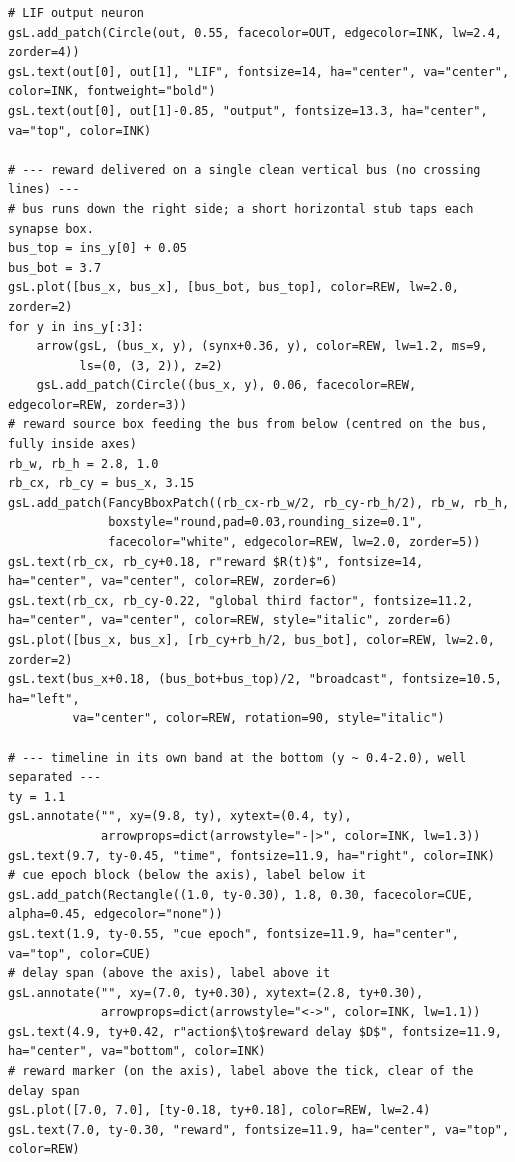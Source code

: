\begin{lstlisting}[caption={schematics.ipynb code cell 6},label={lst:mrl-nb-schematics-6}]
# LIF output neuron
gsL.add_patch(Circle(out, 0.55, facecolor=OUT, edgecolor=INK, lw=2.4, zorder=4))
gsL.text(out[0], out[1], "LIF", fontsize=14, ha="center", va="center", color=INK, fontweight="bold")
gsL.text(out[0], out[1]-0.85, "output", fontsize=13.3, ha="center", va="top", color=INK)

# --- reward delivered on a single clean vertical bus (no crossing lines) ---
# bus runs down the right side; a short horizontal stub taps each synapse box.
bus_top = ins_y[0] + 0.05
bus_bot = 3.7
gsL.plot([bus_x, bus_x], [bus_bot, bus_top], color=REW, lw=2.0, zorder=2)
for y in ins_y[:3]:
    arrow(gsL, (bus_x, y), (synx+0.36, y), color=REW, lw=1.2, ms=9,
          ls=(0, (3, 2)), z=2)
    gsL.add_patch(Circle((bus_x, y), 0.06, facecolor=REW, edgecolor=REW, zorder=3))
# reward source box feeding the bus from below (centred on the bus, fully inside axes)
rb_w, rb_h = 2.8, 1.0
rb_cx, rb_cy = bus_x, 3.15
gsL.add_patch(FancyBboxPatch((rb_cx-rb_w/2, rb_cy-rb_h/2), rb_w, rb_h,
              boxstyle="round,pad=0.03,rounding_size=0.1",
              facecolor="white", edgecolor=REW, lw=2.0, zorder=5))
gsL.text(rb_cx, rb_cy+0.18, r"reward $R(t)$", fontsize=14, ha="center", va="center", color=REW, zorder=6)
gsL.text(rb_cx, rb_cy-0.22, "global third factor", fontsize=11.2, ha="center", va="center", color=REW, style="italic", zorder=6)
gsL.plot([bus_x, bus_x], [rb_cy+rb_h/2, bus_bot], color=REW, lw=2.0, zorder=2)
gsL.text(bus_x+0.18, (bus_bot+bus_top)/2, "broadcast", fontsize=10.5, ha="left",
         va="center", color=REW, rotation=90, style="italic")

# --- timeline in its own band at the bottom (y ~ 0.4-2.0), well separated ---
ty = 1.1
gsL.annotate("", xy=(9.8, ty), xytext=(0.4, ty),
             arrowprops=dict(arrowstyle="-|>", color=INK, lw=1.3))
gsL.text(9.7, ty-0.45, "time", fontsize=11.9, ha="right", color=INK)
# cue epoch block (below the axis), label below it
gsL.add_patch(Rectangle((1.0, ty-0.30), 1.8, 0.30, facecolor=CUE, alpha=0.45, edgecolor="none"))
gsL.text(1.9, ty-0.55, "cue epoch", fontsize=11.9, ha="center", va="top", color=CUE)
# delay span (above the axis), label above it
gsL.annotate("", xy=(7.0, ty+0.30), xytext=(2.8, ty+0.30),
             arrowprops=dict(arrowstyle="<->", color=INK, lw=1.1))
gsL.text(4.9, ty+0.42, r"action$\to$reward delay $D$", fontsize=11.9, ha="center", va="bottom", color=INK)
# reward marker (on the axis), label above the tick, clear of the delay span
gsL.plot([7.0, 7.0], [ty-0.18, ty+0.18], color=REW, lw=2.4)
gsL.text(7.0, ty-0.30, "reward", fontsize=11.9, ha="center", va="top", color=REW)


\end{lstlisting}
